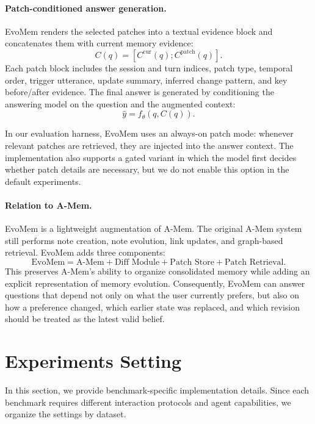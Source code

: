 \documentclass{llmxive}
\begin{document}
\paragraph{Patch-conditioned answer generation.}
EvoMem renders the selected patches into a textual evidence block and concatenates them with current memory evidence:
\[
C(q)=\left[C^{\mathrm{cur}}(q); C^{\mathrm{patch}}(q)\right].
\]
Each patch block includes the session and turn indices, patch type, temporal order, trigger utterance, update summary, inferred change pattern, and key before/after evidence. The final answer is generated by conditioning the answering model on the question and the augmented context:
\[
\hat{y}=f_\theta(q,C(q)).
\]

In our evaluation harness, EvoMem uses an always-on patch mode: whenever relevant patches are retrieved, they are injected into the answer context. The implementation also supports a gated variant in which the model first decides whether patch details are necessary, but we do not enable this option in the default experiments.

\paragraph{Relation to A-Mem.}
EvoMem is a lightweight augmentation of A-Mem. The original A-Mem system still performs note creation, note evolution, link updates, and graph-based retrieval. EvoMem adds three components:
\[
\text{EvoMem}
=
\text{A-Mem}
+
\text{Diff Module}
+
\text{Patch Store}
+
\text{Patch Retrieval}.
\]
This preserves A-Mem's ability to organize consolidated memory while adding an explicit representation of memory evolution. Consequently, EvoMem can answer questions that depend not only on what the user currently prefers, but also on how a preference changed, which earlier state was replaced, and which revision should be treated as the latest valid belief.






\section{Experiments Setting}
\label{appendix:exp_setting}

In this section, we provide benchmark-specific implementation details. Since each benchmark requires different interaction protocols and agent capabilities, we organize the settings by dataset.
\end{document}
